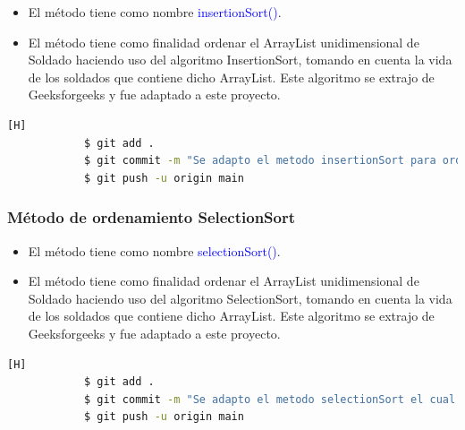 \documentclass{article}
\begin{document}
        \begin{itemize}
            \item El método tiene como nombre \textcolor{blue}{insertionSort()}.
            \item El método tiene como finalidad ordenar el ArrayList unidimensional de Soldado haciendo uso del algoritmo InsertionSort, tomando en cuenta la vida de los soldados que contiene dicho ArrayList. Este algoritmo se extrajo de Geeksforgeeks y fue adaptado a este proyecto.
        \end{itemize}
        
        

        \begin{lstlisting}[language=bash,caption={Commit: Se implementó el método insertionSort()}][H]
    		$ git add .
    		$ git commit -m "Se adapto el metodo insertionSort para ordenar los ArrayList de soldados"
    		$ git push -u origin main
    	\end{lstlisting}
        
        \newpage
        \subsubsection{Método de ordenamiento SelectionSort}

        \begin{itemize}
            \item El método tiene como nombre \textcolor{blue}{selectionSort()}.
            \item El método tiene como finalidad ordenar el ArrayList unidimensional de Soldado haciendo uso del algoritmo SelectionSort, tomando en cuenta la vida de los soldados que contiene dicho ArrayList. Este algoritmo se extrajo de Geeksforgeeks y fue adaptado a este proyecto.
        \end{itemize}

        

        \begin{lstlisting}[language=bash,caption={Commit: Se implementó el método selectionSort()}][H]
    		$ git add .
    		$ git commit -m "Se adapto el metodo selectionSort el cual es nuestro ultimo metodo de algoritmo de ordenamiento para que trabaje con ArrayList de soldados"			
    		$ git push -u origin main
    	\end{lstlisting}
        
\end{document}
